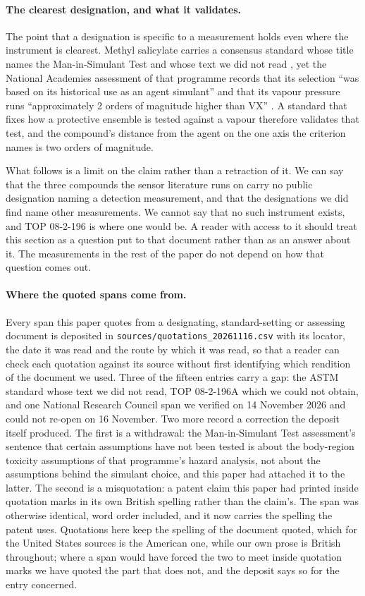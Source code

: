 \documentclass[11pt,a4paper]{article}
\begin{document}
\paragraph{The clearest designation, and what it validates.} The point that a
designation is specific to a measurement holds even where the instrument is
clearest. Methyl salicylate carries a consensus standard whose title names the
Man-in-Simulant Test and whose text we did not read \cite{astmf2588}, yet the
National Academies assessment of that programme records that its selection
``was based on its historical use as an agent simulant'' and that its vapour
pressure runs ``approximately 2 orders of magnitude higher than VX''
\cite{nrc1997mist}. A standard that fixes how a protective ensemble is tested
against a vapour therefore validates that test, and the compound's distance
from the agent on the one axis the criterion names is two orders of magnitude.

What follows is a limit on the claim rather than a retraction of it. We can say
that the three compounds the sensor literature runs on carry no public
designation naming a detection measurement, and that the designations we did
find name other measurements. We cannot say that no such instrument exists, and
TOP 08-2-196 is where one would be. A reader with access to it should treat this
section as a question put to that document rather than as an answer about it.
The measurements in the rest of the paper do not depend on how that question
comes out.

\paragraph{Where the quoted spans come from.} Every span this paper quotes from
a designating, standard-setting or assessing document is deposited in
\texttt{sources/quotations\_20261116.csv} with its locator, the date it was
read and the route by which it was read, so that a reader can check each
quotation against its source without first identifying which rendition of the
document we used. Three of the fifteen entries carry a gap: the ASTM standard
whose text we did not read, TOP 08-2-196A which we could not obtain, and one
National Research Council span we verified on 14 November 2026 and could not
re-open on 16 November. Two more record a correction the deposit itself
produced. The first is a withdrawal: the Man-in-Simulant Test assessment's
sentence that certain assumptions have not been tested is about the body-region
toxicity assumptions of that programme's hazard analysis, not about the
assumptions behind the simulant choice, and this paper had attached it to the
latter. The second is a misquotation: a patent claim this paper had printed
inside quotation marks in its own British spelling rather than the claim's. The
span was otherwise identical, word order included, and it now carries the
spelling the patent uses. Quotations here keep the spelling of the document
quoted, which for the United States sources is the American one, while our own
prose is British throughout; where a span would have forced the two to meet
inside quotation marks we have quoted the part that does not, and the deposit
says so for the entry concerned.
\end{document}
